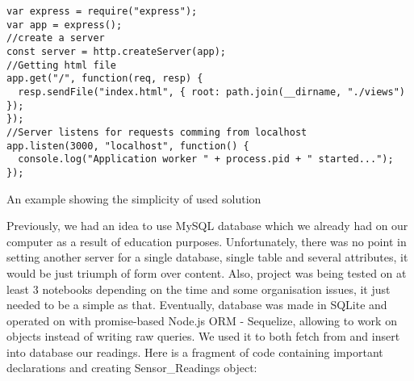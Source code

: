 \documentclass[oneside,a4paper,11pt]{report}
\begin{document}
\begin{lstlisting}[style=JavaScript]
var express = require("express");
var app = express();
//create a server
const server = http.createServer(app); 
//Getting html file
app.get("/", function(req, resp) {
  resp.sendFile("index.html", { root: path.join(__dirname, "./views") });
});
//Server listens for requests comming from localhost
app.listen(3000, "localhost", function() {
  console.log("Application worker " + process.pid + " started...");
});
\end{lstlisting}
\begin{center}
An example showing the simplicity of used solution
\end{center}
\hspace{1cm}Previously, we had an idea to use MySQL database which we already had on our computer as a result of education purposes. Unfortunately, there was no point in setting another server for a single database, single table and several attributes, it would be just triumph of form over content. Also, project was being tested on at least 3 notebooks depending on the time and some organisation issues, it just needed to be a simple as that. Eventually, database was made in SQLite and operated on with promise-based Node.js ORM - Sequelize, allowing to work on objects instead of writing raw queries. We used it to both fetch from and insert into database our readings. Here is a fragment of code containing important declarations and creating Sensor\_Readings object:
\end{document}
